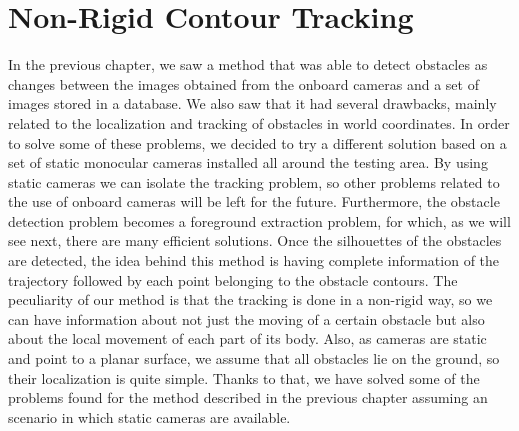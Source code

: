 
\graphicspath{{./images/chapter02/bmps/}{./images/chapter02/vects/}{./images/chapter02/}}

\chapter{Non-Rigid Contour Tracking}\label{ch:chapter02}

In the previous chapter, we saw a method that was able to detect obstacles as changes between the images obtained from the onboard cameras and a set of images stored in a database. We also saw that it had several drawbacks, mainly related to the localization and tracking of obstacles in world coordinates. In order to solve some of these problems, we decided to try a different solution based on a set of static monocular cameras installed all around the testing area. 
By using static cameras we can isolate the tracking problem, so other problems related to the use of onboard cameras will be left for the future. Furthermore, the obstacle detection problem becomes a foreground extraction problem, for which, as we will see next, there are many efficient solutions. 
Once the silhouettes of the obstacles are detected, the idea behind this method is having complete information of the trajectory followed by each point belonging to the obstacle contours. The peculiarity of our method is that the tracking is done in a non-rigid way, so we can have information about not just the moving of a certain obstacle but also about the local movement of each part of its body.
Also, as cameras are static and point to a planar surface, we assume that all obstacles lie on the ground, so their localization is quite simple. Thanks to that, we have solved some of the problems found for the method described in the previous chapter assuming an scenario in which static cameras are available. 

